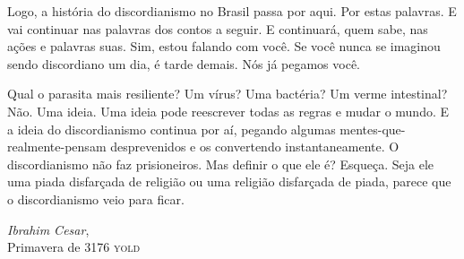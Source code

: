 Logo, a história do discordianismo no Brasil passa por aqui. Por estas palavras. E vai continuar nas palavras dos contos a seguir. E continuará, quem sabe, nas ações e palavras suas. Sim, estou falando com você. Se você nunca se imaginou sendo discordiano um dia, é tarde demais. Nós já pegamos você.

Qual o parasita mais resiliente? Um vírus? Uma bactéria? Um verme intestinal? Não. Uma ideia. Uma ideia pode reescrever todas as regras e mudar o mundo. E a ideia do discordianismo continua por aí, pegando algumas mentes-que-realmente-pensam desprevenidos e os convertendo instantaneamente. O discordianismo não faz prisioneiros. Mas definir o que ele é? Esqueça. Seja ele uma piada disfarçada de religião ou uma religião disfarçada de piada, parece que o discordianismo veio para ficar.

	\begin{flushright}
	\emph{Ibrahim Cesar},\\
	Primavera de 3176 \textsc{yold}
	\end{flushright}

%
